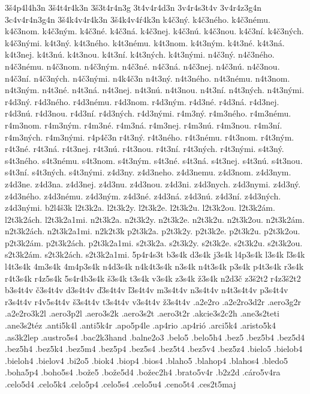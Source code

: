 {3š4p4l4h3n
3š4t4r4k3n
3š3t4r4n3g
3t4v4r4d3n
3v4r4s3t4v
3v4r4z3g4n
3c4v4r4n3g4n
3š4k4v4r4k3n
3š4k4v4ŕ4k3n
k4č3ný.
k4č3ného.
k4č3nému.
k4č3nom.
k4č3ným.
k4č3né.
k4č3ná.
k4č3nej.
k4č3nú.
k4č3nou.
k4č3ní.
k4č3ných.
k4č3nými.
k4t3ný.
k4t3ného.
k4t3nému.
k4t3nom.
k4t3ným.
k4t3né.
k4t3ná.
k4t3nej.
k4t3nú.
k4t3nou.
k4t3ní.
k4t3ných.
k4t3nými.
n4č3ný.
n4č3ného.
n4č3nému.
n4č3nom.
n4č3ným.
n4č3né.
n4č3ná.
n4č3nej.
n4č3nú.
n4č3nou.
n4č3ní.
n4č3ných.
n4č3nými.
n4k4č3n
n4t3ný.
n4t3ného.
n4t3nému.
n4t3nom.
n4t3ným.
n4t3né.
n4t3ná.
n4t3nej.
n4t3nú.
n4t3nou.
n4t3ní.
n4t3ných.
n4t3nými.
r4d3ný.
r4d3ného.
r4d3nému.
r4d3nom.
r4d3ným.
r4d3né.
r4d3ná.
r4d3nej.
r4d3nú.
r4d3nou.
r4d3ní.
r4d3ných.
r4d3nými.
r4m3ný.
r4m3ného.
r4m3nému.
r4m3nom.
r4m3ným.
r4m3né.
r4m3ná.
r4m3nej.
r4m3nú.
r4m3nou.
r4m3ní.
r4m3ných.
r4m3nými.
r4p4č3n
r4t3ný.
r4t3ného.
r4t3nému.
r4t3nom.
r4t3ným.
r4t3né.
r4t3ná.
r4t3nej.
r4t3nú.
r4t3nou.
r4t3ní.
r4t3ných.
r4t3nými.
s4t3ný.
s4t3ného.
s4t3nému.
s4t3nom.
s4t3ným.
s4t3né.
s4t3ná.
s4t3nej.
s4t3nú.
s4t3nou.
s4t3ní.
s4t3ných.
s4t3nými.
z4d3ny.
z4d3neho.
z4d3nemu.
z4d3nom.
z4d3nym.
z4d3ne.
z4d3na.
z4d3nej.
z4d3nu.
z4d3nou.
z4d3ni.
z4d3nych.
z4d3nymi.
z4d3ný.
z4d3ného.
z4d3nému.
z4d3ným.
z4d3né.
z4d3ná.
z4d3nú.
z4d3ní.
z4d3ných.
z4d3nými.
b2l4š3k
l2t3k2a.
l2t3k2y.
l2t3k2e.
l2t3k2u.
l2t3k2ou.
l2t3k2ám.
l2t3k2ách.
l2t3k2a1mi.
n2t3k2a.
n2t3k2y.
n2t3k2e.
n2t3k2u.
n2t3k2ou.
n2t3k2ám.
n2t3k2ách.
n2t3k2a1mi.
n2k2t3k
p2t3k2a.
p2t3k2y.
p2t3k2e.
p2t3k2u.
p2t3k2ou.
p2t3k2ám.
p2t3k2ách.
p2t3k2a1mi.
s2t3k2a.
s2t3k2y.
s2t3k2e.
s2t3k2u.
s2t3k2ou.
s2t3k2ám.
s2t3k2ách.
s2t3k2a1mi.
5p4r4s3t
b3s4k
d3s4k
j3s4k
l4p3s4k
l3s4k
ľ3s4k
l4t3s4k
4m3s4k
4m4p3s4k
n4d3s4k
n4k4t3s4k
n3s4k
n4t3s4k
p3s4k
p4t3s4k
r3s4k
r4t3s4k
r4z5s4k
5s4r4b3s4k
š3s4k
t3s4k
v3s4k
z3s4k
ž3s4k
n2d3č
z3š2t2
r4z3š2t2
b3s4t4v
č3s4t4v
d3s4t4v
ď3s4t4v
ľ3s4t4v
m3s4t4v
n3s4t4v
n4t3s4t4v
p3s4t4v
r3s4t4v
r4v5s4t4v
š3s4t4v
t3s4t4v
v3s4t4v
ž3s4t4v
.a2e2ro
.a2e2ro3d2r
.aero3g2r
.a2e2ro3k2l
.aero3p2l
.aero3s2k
.aero3s2t
.aero3t2r
.akcie3s2c2h
.ane3s2teti
.ane3s2téz
.anti5k4l
.anti5k4r
.apo5p4le
.ap4rio
.ap4rió
.arci5k4
.aristo5k4
.as3k2lep
.austro5s4
.bac2k3hand
.balne2o3
.belo5
.belo5h4
.bez5
.bez5b4
.bez5d4
.bez5h4
.bez5k4
.bez5m4
.bez5p4
.bez5s4
.bez5t4
.bez5v4
.bez5z4
.bielo5
.bielob4
.bieloh4
.bielov4
.bi2o5
.biok4
.biop4
.bios4
.blaho5
.blahop4
.blahos4
.bledo5
.boha5p4
.boho5s4
.bože5
.bože5d4
.božec2h4
.brato5v4r
.b2z2d
.cáro5v4ra
.celo5d4
.celo5k4
.celo5p4
.celo5s4
.celo5u4
.ceno5t4
.ces2t5maj
}
